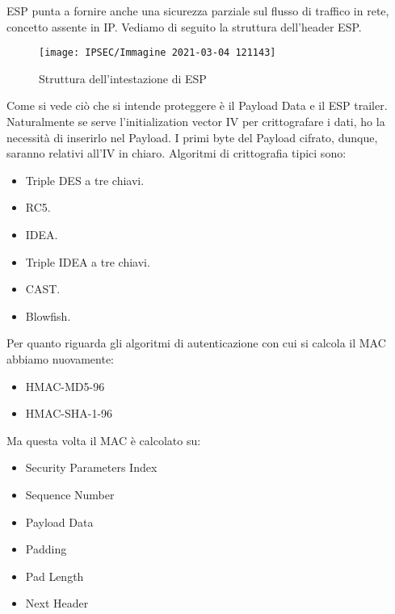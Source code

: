 \documentclass[14pt]{extreport}
\begin{document}
ESP punta a fornire anche una sicurezza parziale sul flusso di traffico in rete, concetto assente in IP. Vediamo di seguito la struttura dell'header ESP.










\begin{figure}[H]
    \centering
    \texttt{[image: IPSEC/Immagine 2021-03-04 121143]}
    \caption{Struttura dell'intestazione di ESP}
    \label{IPSEC11}
\end{figure}



Come si vede ciò che si intende proteggere è il Payload Data e il ESP trailer. Naturalmente se serve l'initialization vector IV per crittografare i dati, ho la necessità di inserirlo nel Payload. I primi byte del Payload cifrato, dunque, saranno relativi all'IV in chiaro. Algoritmi di crittografia tipici sono:


\begin{itemize}
    \item Triple DES a tre chiavi.
    
    \item RC5.
    
    \item IDEA.
    
    \item Triple IDEA a tre chiavi.
    
    \item CAST.
    
    \item Blowfish.
\end{itemize}
Per quanto riguarda gli algoritmi di autenticazione con cui si calcola il MAC abbiamo nuovamente:


\begin{itemize}
    \item HMAC-MD5-96
    
    \item HMAC-SHA-1-96
\end{itemize}

Ma questa volta il MAC è calcolato su:

\begin{itemize}
    \item Security Parameters Index
    
    \item Sequence Number
    
    \item Payload Data
    
    \item Padding
    
    \item Pad Length
    
    \item Next Header
\end{itemize}
\end{document}
